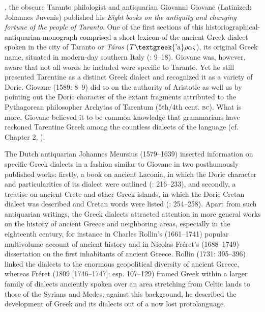 \documentclass[output=paper]{langsci/langscibook}
\begin{document}
\citealt{In1589}, the obscure Taranto philologist and antiquarian Giovanni Giovane (Latinized: Johannes Juvenis) published his \textit{Eight} \textit{books} \textit{on} \textit{the} \textit{antiquity} \textit{and} \textit{changing} \textit{fortune} \textit{of} \textit{the} \textit{people} \textit{of} \textit{Taranto}. One of the first sections of this historiographical-antiquarian monograph comprised a short lexicon of the ancient Greek dialect spoken in the city of Taranto or \textit{Táras} ($T\text{\textgreek{'a}}\rho \alpha \varsigma $), its original Greek name, situated in modern-day southern Italy (\citealt{Giovane1589}: 9–18). Giovane was, however, aware that not all words he included were specific to Taranto. Yet he still presented Tarentine as a distinct Greek dialect and recognized it as a variety of Doric. Giovane (1589: 8–9) did so on the authority of Aristotle as well as by pointing out the Doric character of the extant fragments attributed to the Pythagorean philosopher Archytas of Tarentum (5th/4th cent. \textsc{bc}). What is more, Giovane believed it to be common knowledge that grammarians have reckoned Tarentine Greek among the countless dialects of the language (cf. Chapter 2, ).

The Dutch antiquarian Johannes Meursius (1579–1639) inserted information on specific Greek dialects in a fashion similar to Giovane in two posthumously published works: firstly, a book on ancient Laconia, in which the Doric character and particularities of its dialect were outlined (\citealt{Meursius1661}: 216–233), and secondly, a treatise on ancient Crete and other Greek islands, in which the Doric Cretan dialect was described and Cretan words were listed (\citealt{Meursius1675}: 254–258). Apart from such antiquarian writings, the Greek dialects attracted attention in more general works on the history of ancient Greece and neighboring areas, especially in the eighteenth century, for instance in Charles Rollin’s (1661–1741) popular multivolume account of ancient history and in Nicolas Fréret’s (1688–1749) dissertation on the first inhabitants of ancient Greece. Rollin (1731: 395–396) linked the dialects to the enormous geopolitical diversity of ancient Greece, whereas Fréret (1809 [1746–1747]: esp. 107–129) framed Greek within a larger family of dialects anciently spoken over an area stretching from Celtic lands to those of the Syrians and Medes; against this background, he described the development of Greek and its dialects out of a now lost protolanguage.
\end{document}
